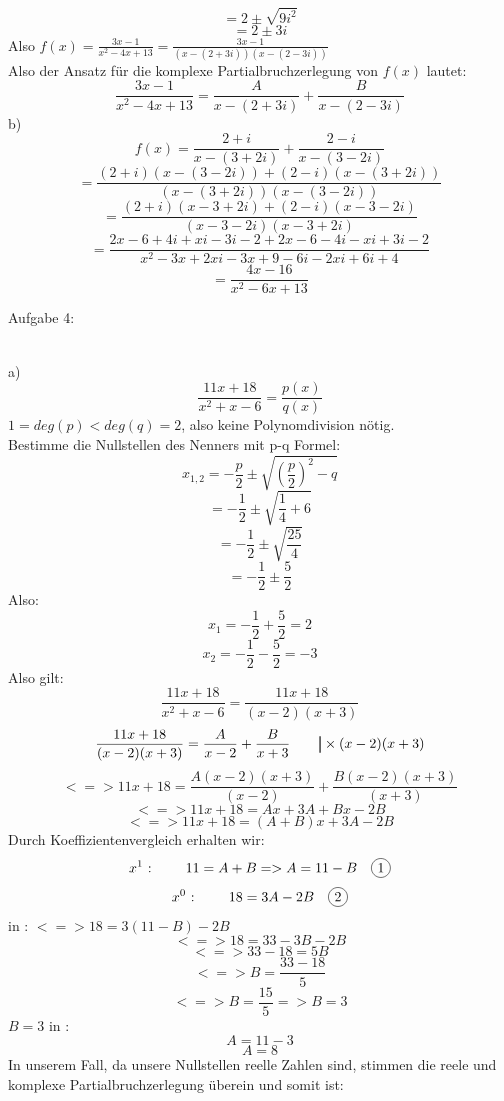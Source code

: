 \documentclass[11pt]{article}
\newcommand\mybar{\kern1pt\rule[-\dp\strutbox]{.8pt}{\baselineskip}\kern1pt}
\newcommand*\circled[1]{\tikz[baseline=(char.base)]{
            \node[shape=circle,draw,inner sep=2pt] (char) {#1};}}
\begin{document}
				$$=2 \pm \sqrt{9i^2}$$
				$$=2\pm 3i$$
				Also $f(x)=\frac{3x-1}{x^2-4x+13}=\frac{3x-1}{(x-(2+3i))(x-(2-3i))}$\\
				Also der Ansatz für die komplexe Partialbruchzerlegung von $f(x)$ lautet:
				$$\frac{3x-1}{x^2-4x+13}=\frac{A}{x-(2+3i)}+\frac{B}{x-(2-3i)}$$
			\indent b)\\
				$$f(x)=\frac{2+i}{x-(3+2i)}+\frac{2-i}{x-(3-2i)}$$
				$$=\frac{(2+i)(x-(3-2i))+(2-i)(x-(3+2i))}{(x-(3+2i))(x-(3-2i))}$$
				$$=\frac{(2+i)(x-3+2i)+(2-i)(x-3-2i)}{(x-3-2i)(x-3+2i)}$$
				$$=\frac{2x-6+4i+xi-3i-2+2x-6-4i-xi+3i-2}{x^2-3x+2xi-3x+9-6i-2xi+6i+4}$$
				$$=\frac{4x-16}{x^2-6x+13}$$
		\noindent \begin{Large}Aufgabe 4:\end{Large}\\[2pt]
			\indent a)\\
				$$\frac{11x+18}{x^2+x-6}=\frac{p(x)}{q(x)}$$
				$1=deg(p)<deg(q)=2$, also keine Polynomdivision nötig.\\
				Bestimme die Nullstellen des Nenners mit p-q Formel:\\
				$$x_{1,2}=-\frac{p}{2}\pm \sqrt{\left(\frac{p}{2}\right)^2-q}$$
				$$=-\frac{1}{2}\pm\sqrt{\frac{1}{4}+6}$$
				$$=-\frac{1}{2}\pm\sqrt{\frac{25}{4}}$$
				$$=-\frac{1}{2}\pm\frac{5}{2}$$
				Also:\\
				$$x_1=-\frac{1}{2}+\frac{5}{2}=2$$
				$$x_2=-\frac{1}{2}-\frac{5}{2}=-3$$
				Also gilt:\\
				$$\frac{11x+18}{x^2+x-6}=\frac{11x+18}{(x-2)(x+3)}$$
				$$\frac{11x+18}{(x-2)(x+3)}=\frac{A}{x-2}+\frac{B}{x+3} \hspace{20pt} \mybar \times (x-2)(x+3)$$
				$$<=>11x+18=\frac{A(x-2)(x+3)}{(x-2)}+\frac{B(x-2)(x+3)}{(x+3)}$$
				$$<=>11x+18=Ax+3A+Bx-2B$$
				$$<=>11x+18=(A+B)x+3A-2B$$
				Durch Koeffizientenvergleich erhalten wir:\\
				$$x^1 \mbox{ : } \hspace{20pt} 11=A+B=>A=11-B \hspace{10pt} \mbox{\circled{1}}$$
				$$x^0 \mbox{ : } \hspace{20pt} 18=3A-2B \hspace{10pt} \mbox{\circled{2}}$$
				\indent \circled{1} in \circled{2}: \hspace{50pt} $<=>18=3(11-B)-2B$
				$$<=>18=33-3B-2B$$
				$$<=>33-18=5B$$
				$$<=>B=\frac{33-18}{5}$$
				$$<=>B=\frac{15}{5}=>B=3$$
				\indent $B=3$ in \circled{1}:\\
				$$A=11-3$$
				$$A=8$$
				In unserem Fall, da unsere Nullstellen reelle Zahlen sind, stimmen die reele und komplexe Partialbruchzerlegung überein und somit ist:\\
\end{document}
